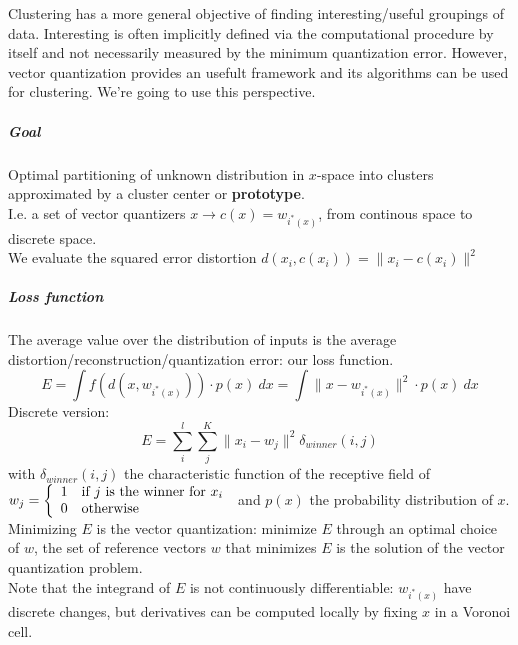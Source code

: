 \documentclass[10pt]{report}
\begin{document}
Clustering has a more general objective of finding interesting/useful groupings of data. Interesting is often implicitly defined via the computational procedure by itself and not necessarily measured by the minimum quantization error. However, vector quantization provides an usefult framework and its algorithms can be used for clustering. We're going to use this perspective.
\subparagraph{Goal} Optimal partitioning of unknown distribution in $x$-space into clusters approximated by a cluster center or \textbf{prototype}.\\
I.e. a set of vector quantizers $x\rightarrow c(x) = w_{i^*(x)}$, from continous space to discrete space.\\
We evaluate the squared error distortion $d(x_i,c(x_i)) = \|x_i-c(x_i)\|^2$
\subparagraph{Loss function} The average value over the distribution of inputs is the average distortion/reconstruction/quantization error: our loss function. $$E = \int f(d(x,w_{i^*(x)}))\cdot p(x)\:dx= \int\|x-w_{i^*(x)}\|^2\cdot p(x)\:dx$$
Discrete version: $$E = \sum_i^l\sum_j^K\|x_i-w_j\|^2\delta_{winner}(i,j)$$ with $\delta_{winner}(i,j)$ the characteristic function of the receptive field of $w_j = \left\{\begin{array}{l l}
1&\text{if }j\text{ is the winner for }x_i\\
0&\text{otherwise}
\end{array}\right.$ and $p(x)$ the probability distribution of $x$.\\
Minimizing $E$ is the vector quantization: minimize $E$ through an optimal choice of $w$, the set of reference vectors $w$ that minimizes $E$ is the solution of the vector quantization problem.\\
Note that the integrand of $E$ is not continuously differentiable: $w_{i^*(x)}$ have discrete changes, but derivatives can be computed locally by fixing $x$ in a Voronoi cell.
\end{document}
